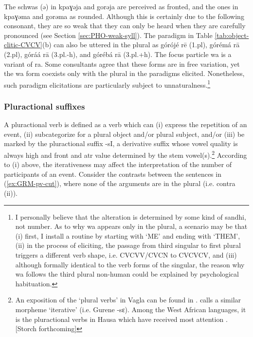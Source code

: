 \begin{exe}
\begin{exe}
\begin{exe}
{\begin{exe}
\begin{exe}
\begin{exe}
\begin{exe}
\begin{exe}
\begin{exe}
\begin{exe}
\begin{exe}
\begin{exe}
\begin{exe}
\begin{exe}
\begin{exe}
\begin{exe}
\begin{exe}
\begin{exe}
\begin{exe}
\begin{exe}
\begin{exe}
\begin{exe}
\begin{exe}
\begin{exe}
The schwas ({\sls ə}) in {\sls kpaɣəja} and  {\sls gorəja} are perceived as 
fronted,
and the ones in {\sls kpaɣəma} and {\sls gorəma}  as rounded. Although this is
certainly due to the following consonant, they are so weak that they can only be
heard when they are carefully pronounced (see Section \ref{sec:PHO-weak-syll}). 
The paradigm in Table  
\ref{tab:object-clitic-CVCV}(b) can also be uttered in the plural as 
{\sls górójé rē} ({\sc 1.pl}),  %
{\sls górémá rā} ({\sc 2.pl}), %
{\sls góráá rā} ({\sc 3.pl.-h}), and %
{\sls górébá rā} ({\sc 3.pl.+h}). 
 The focus particle {\sls wa} is a
variant of {\sls ra}. Some consultants  agree that these forms are in free 
variation,
yet the {\sls wa} form coexists only with  the plural in the paradigms elicited.
Nonetheless, such paradigm elicitations are particularly subject to
unnaturalness.\footnote{I personally believe that the alteration is
determined by some kind of sandhi, not number. As to why {\sls wa} appears only 
in
the plural, a scenario may be that (i) first, I install a routine by starting
with `ME' and ending with `THEM', (ii) in the process of eliciting, the passage
from third singular to first plural triggers  a different verb shape, i.e.
CVCVV/CVCN  to CVCVCV, and (iii)  although formally identical to the verb forms
of the singular, the reason why {\sls wa} follows the third plural non-human 
could
be explained by psychological habituation.}

\subsubsection{Pluractional suffixes}
\label{sec:GRM-PluralVerb}


A pluractional verb is defined as a verb which can (i) express the repetition of
an event,  (ii)   subcategorize for a plural object and/or  plural subject,
and/or  (iii)  be marked by the pluractional suffix {\sls -sI}, a derivative 
suffix whose  vowel quality is always high and
front
and  {\sc atr} value determined by the stem vowel(s).\footnote{An exposition of
the
`plural verbs' in Vagla can be found in \citet{Blen03}. \citet[viii]{daku07}
calls a similar morpheme `iterative' (i.e. Gurene {\sls -sɛ}).  Among the West
African
languages, it is the pluractional verbs in Hausa which have received most
attention \citep[see][]{Jose08}. [Storch forthcoming]}  According to (i) above, 
the iterativeness may
affect the interpretation of the number of participants of an event. Consider
the contrasts between the 
sentences in (\ref{ex:GRM-pv-cut}), where none of the arguments are in the
plural (i.e. contra (ii)).



\end{exe}
\end{exe}
\end{exe}
\end{exe}
\end{exe}
\end{exe}
\end{exe}
\end{exe}
\end{exe}
\end{exe}
\end{exe}
\end{exe}
\end{exe}
\end{exe}
\end{exe}
\end{exe}
\end{exe}
\end{exe}
\end{exe}
\end{exe}
\end{exe}}
\end{exe}
\end{exe}
\end{exe}
